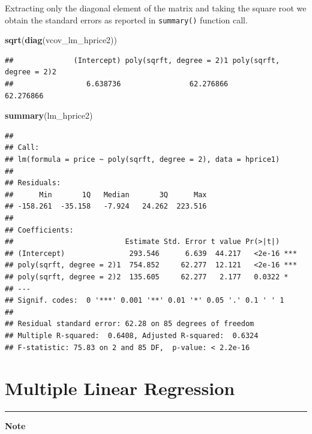 \documentclass[]{book}
\newenvironment{Shaded}{\begin{snugshade}}{\end{snugshade}}
\newcommand{\KeywordTok}[1]{\textcolor[rgb]{0.13,0.29,0.53}{\textbf{#1}}}
\newcommand{\NormalTok}[1]{#1}
\begin{document}
Extracting only the diagonal element of the matrix and taking the square root we obtain the standard errors as reported in \texttt{summary()} function call.

\begin{Shaded}
\begin{Highlighting}[]
\KeywordTok{sqrt}\NormalTok{(}\KeywordTok{diag}\NormalTok{(vcov_lm_hprice2))}
\end{Highlighting}
\end{Shaded}

\begin{verbatim}
##              (Intercept) poly(sqrft, degree = 2)1 poly(sqrft, degree = 2)2 
##                 6.638736                62.276866                62.276866
\end{verbatim}

\begin{Shaded}
\begin{Highlighting}[]
\KeywordTok{summary}\NormalTok{(lm_hprice2)}
\end{Highlighting}
\end{Shaded}

\begin{verbatim}
## 
## Call:
## lm(formula = price ~ poly(sqrft, degree = 2), data = hprice1)
## 
## Residuals:
##      Min       1Q   Median       3Q      Max 
## -158.261  -35.158   -7.924   24.262  223.516 
## 
## Coefficients:
##                          Estimate Std. Error t value Pr(>|t|)    
## (Intercept)               293.546      6.639  44.217   <2e-16 ***
## poly(sqrft, degree = 2)1  754.852     62.277  12.121   <2e-16 ***
## poly(sqrft, degree = 2)2  135.605     62.277   2.177   0.0322 *  
## ---
## Signif. codes:  0 '***' 0.001 '**' 0.01 '*' 0.05 '.' 0.1 ' ' 1
## 
## Residual standard error: 62.28 on 85 degrees of freedom
## Multiple R-squared:  0.6408, Adjusted R-squared:  0.6324 
## F-statistic: 75.83 on 2 and 85 DF,  p-value: < 2.2e-16
\end{verbatim}

\hypertarget{multiple-linear-regression}{%
\section{Multiple Linear Regression}\label{multiple-linear-regression}}

\begin{center}\rule{0.5\linewidth}{\linethickness}\end{center}

\textbf{Note}
\end{document}
